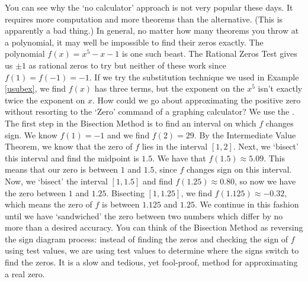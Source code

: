 You can see why the `no calculator' approach is not very popular these days.  It requires more computation and more theorems than the alternative. (This is apparently a bad thing.)  In general, no matter how many theorems you throw at a polynomial, it may well be impossible to find their zeros exactly.  The polynomial $f(x) = x^5-x-1$ is one such beast.   The Rational Zeros Test gives us $\pm 1$ as rational zeros to try but neither of these work since $f(1) = f(-1) = -1$.  If we try the substitution technique we used in Example \ref{usubex}, we find $f(x)$ has three terms, but the exponent on the $x^5$ isn't exactly twice the exponent on $x$.  How could we go about approximating the positive zero without resorting to the `Zero' command of a graphing calculator?  We use the  .  The first step in the Bisection Method is to find an interval on which $f$ changes sign.  We know $f(1) = -1$ and we find $f(2) = 29$.  By the Intermediate Value Theorem, we know that the zero of $f$ lies in the interval $[1,2]$.  Next, we `bisect' this interval and find the midpoint is $1.5$.  We have that $f(1.5)\approx 5.09$.  This means that our zero is between $1$ and $1.5$, since $f$ changes sign on this interval.  Now, we `bisect' the interval $[1,1.5]$ and find $f(1.25) \approx 0.80$, so now we have the zero between $1$ and $1.25$.  Bisecting $[1,1.25]$, we find $f(1.125) \approx -0.32$, which means the zero of $f$ is between $1.125$ and $1.25$.  We continue in this fashion until we have `sandwiched' the zero between two numbers which differ by no more than a desired accuracy. You can think of the Bisection Method as reversing the sign diagram process:  instead of finding the zeros and checking the sign of $f$ using test values, we are using test values to determine where the signs switch to find the zeros.  It is a slow and tedious, yet fool-proof, method for approximating a real zero.  

{}

